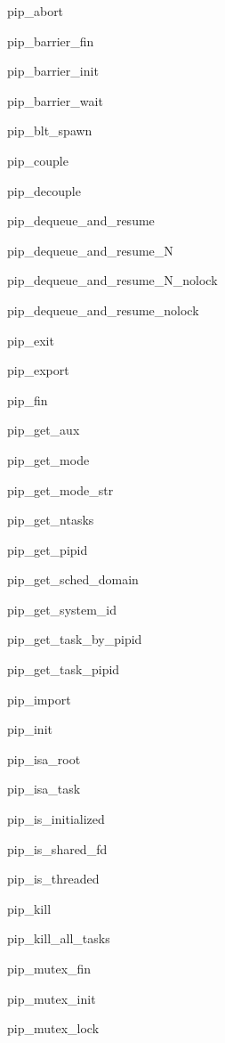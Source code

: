 \documentclass[twoside]{book}
\begin{document}
\begin{DoxyItemize}
\item pip\-\_\-abort
\item pip\-\_\-barrier\-\_\-fin
\item pip\-\_\-barrier\-\_\-init
\item pip\-\_\-barrier\-\_\-wait
\item pip\-\_\-blt\-\_\-spawn
\item pip\-\_\-couple
\item pip\-\_\-decouple
\item pip\-\_\-dequeue\-\_\-and\-\_\-resume
\item pip\-\_\-dequeue\-\_\-and\-\_\-resume\-\_\-\-N
\item pip\-\_\-dequeue\-\_\-and\-\_\-resume\-\_\-\-N\-\_\-nolock
\item pip\-\_\-dequeue\-\_\-and\-\_\-resume\-\_\-nolock
\item pip\-\_\-exit
\item pip\-\_\-export
\item pip\-\_\-fin
\item pip\-\_\-get\-\_\-aux
\item pip\-\_\-get\-\_\-mode
\item pip\-\_\-get\-\_\-mode\-\_\-str
\item pip\-\_\-get\-\_\-ntasks
\item pip\-\_\-get\-\_\-pipid
\item pip\-\_\-get\-\_\-sched\-\_\-domain
\item pip\-\_\-get\-\_\-system\-\_\-id
\item pip\-\_\-get\-\_\-task\-\_\-by\-\_\-pipid
\item pip\-\_\-get\-\_\-task\-\_\-pipid
\item pip\-\_\-import
\item pip\-\_\-init
\item pip\-\_\-isa\-\_\-root
\item pip\-\_\-isa\-\_\-task
\item pip\-\_\-is\-\_\-initialized
\item pip\-\_\-is\-\_\-shared\-\_\-fd
\item pip\-\_\-is\-\_\-threaded
\item pip\-\_\-kill
\item pip\-\_\-kill\-\_\-all\-\_\-tasks
\item pip\-\_\-mutex\-\_\-fin
\item pip\-\_\-mutex\-\_\-init
\item pip\-\_\-mutex\-\_\-lock

\end{DoxyItemize}
\end{document}

